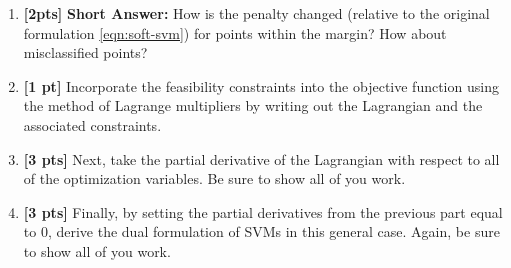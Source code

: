 \begin{enumerate}
\item \textbf{[2pts]} \textbf{Short Answer: }
         How is the penalty changed (relative to the original formulation \ref{eqn:soft-svm}) for points within the margin? How about misclassified points?
        
 
    \begin{tcolorbox}[fit,height=4cm, width=15cm, blank, borderline={1pt}{-2pt},nobeforeafter]
    \end{tcolorbox}
    
    
\item \textbf{[1 pt]} Incorporate the feasibility constraints into the objective function using the method of Lagrange multipliers by writing out the Lagrangian and the associated constraints. 

\begin{tcolorbox}[fit,height=5.0cm, width=0.95\textwidth, blank, borderline={1pt}{-2pt}]
\end{tcolorbox}


\item \textbf{[3 pts]} Next, take the partial derivative of the Lagrangian with respect to all of the optimization variables. Be sure to show all of you work.

\begin{tcolorbox}[fit,height=21.0cm, width=0.95\textwidth, blank, borderline={1pt}{-2pt}]
\end{tcolorbox}

\newpage
\item \textbf{[3 pts]} Finally, by setting the partial derivatives from the previous part equal to 0, derive the dual formulation of SVMs in this general case. Again, be sure to show all of you work.


\begin{tcolorbox}[fit,height=18.0cm, width=0.95\textwidth, blank, borderline={1pt}{-2pt}]
\end{tcolorbox}

\end{enumerate}





